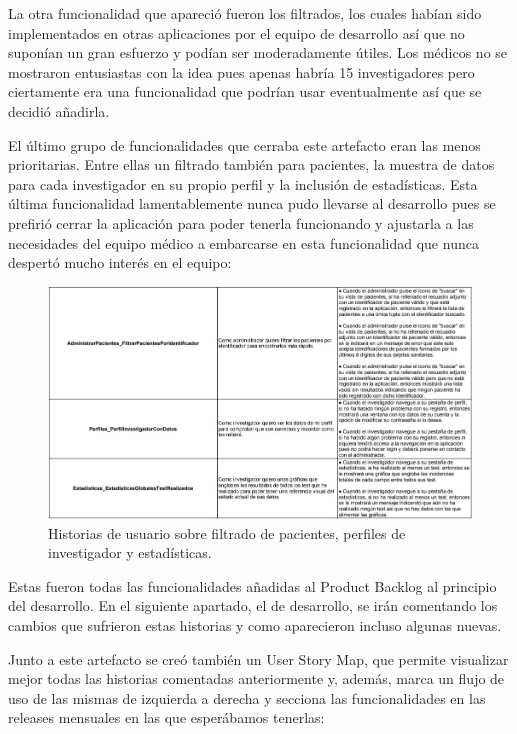 La otra funcionalidad que apareció fueron los filtrados, los cuales habían sido implementados en otras aplicaciones por el equipo de desarrollo así que no suponían un gran esfuerzo y podían ser moderadamente útiles. Los médicos no se mostraron entusiastas con la idea pues apenas habría 15 investigadores pero ciertamente era una funcionalidad que podrían usar eventualmente así que se decidió añadirla.
\newpage

El último grupo de funcionalidades que cerraba este artefacto eran las menos prioritarias. Entre ellas un filtrado también para pacientes, la muestra de datos para cada investigador en su propio perfil y la inclusión de estadísticas. Esta última funcionalidad lamentablemente nunca pudo llevarse al desarrollo pues se prefirió cerrar la aplicación para poder tenerla funcionando y ajustarla a las necesidades del equipo médico a embarcarse en esta funcionalidad que nunca despertó mucho interés en el equipo:
\newline

 \begin{figure}[h]
    \centering
     \includegraphics[width=1\textwidth]{images/historiasUsuario-5.jpg}
    \caption{Historias de usuario sobre filtrado de pacientes, perfiles de investigador y estadísticas.}
\end{figure}

Estas fueron todas las funcionalidades añadidas al Product Backlog al principio del desarrollo. En el siguiente apartado, el de desarrollo, se irán comentando los cambios que sufrieron estas historias y como aparecieron incluso algunas nuevas.
\newpage

Junto a este artefacto se creó también un User Story Map, que permite visualizar mejor todas las historias comentadas anteriormente y, además, marca un flujo de uso de las mismas de izquierda a derecha y secciona las funcionalidades en las releases mensuales en las que esperábamos tenerlas:
\newline

